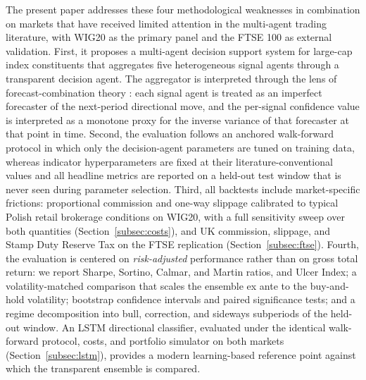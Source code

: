 \documentclass{ieeeaccess}
\begin{document}
The present paper addresses these four methodological weaknesses in combination on markets that have received limited attention in the multi-agent trading literature, with WIG20 as the primary panel and the FTSE 100 as external validation. First, it proposes a multi-agent decision support system for large-cap index constituents that aggregates five heterogeneous signal agents through a transparent decision agent. The aggregator is interpreted through the lens of forecast-combination theory \cite{batesgranger1969,clemen1989,timmermann2006}: each signal agent is treated as an imperfect forecaster of the next-period directional move, and the per-signal confidence value is interpreted as a monotone proxy for the inverse variance of that forecaster at that point in time. Second, the evaluation follows an anchored walk-forward protocol in which only the decision-agent parameters are tuned on training data, whereas indicator hyperparameters are fixed at their literature-conventional values and all headline metrics are reported on a held-out test window that is never seen during parameter selection. Third, all backtests include market-specific frictions: proportional commission and one-way slippage calibrated to typical Polish retail brokerage conditions on WIG20, with a full sensitivity sweep over both quantities (Section~\ref{subsec:costs}), and UK commission, slippage, and Stamp Duty Reserve Tax on the FTSE replication (Section~\ref{subsec:ftse}). Fourth, the evaluation is centered on \emph{risk-adjusted} performance rather than on gross total return: we report Sharpe, Sortino, Calmar, and Martin ratios, and Ulcer Index; a volatility-matched comparison that scales the ensemble ex ante to the buy-and-hold volatility; bootstrap confidence intervals and paired significance tests; and a regime decomposition into bull, correction, and sideways subperiods of the held-out window. An LSTM directional classifier, evaluated under the identical walk-forward protocol, costs, and portfolio simulator on both markets (Section~\ref{subsec:lstm}), provides a modern learning-based reference point against which the transparent ensemble is compared.
\end{document}
